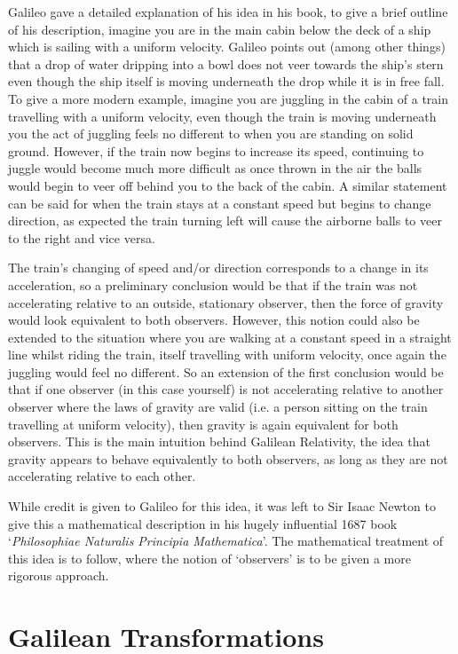 \documentclass[a4paper,12pt,draft]{report}
\begin{document}
Galileo gave a detailed explanation of his idea in his book, to give a brief outline of his description, imagine you are in the main cabin below the deck of a ship which is sailing with a uniform velocity. Galileo points out (among other things) that a drop of water dripping into a bowl does not veer towards the ship's stern even though the ship itself is moving underneath the drop while it is in free fall. To give a more modern example, imagine you are juggling in the cabin of a train travelling with a uniform velocity, even though the train is moving underneath you the act of juggling feels no different to when you are standing on solid ground. However, if the train now begins to increase its speed, continuing to juggle would become much more difficult as once thrown in the air the balls would begin to veer off behind you to the back of the cabin. A similar statement can be said for when the train stays at a constant speed but begins to change direction, as expected the train turning left will cause the airborne balls to veer to the right and vice versa.

The train's changing of speed and/or direction corresponds to a change in its acceleration, so a preliminary conclusion would be that if the train was not accelerating relative to an outside, stationary observer, then the force of gravity would look equivalent to both observers. However, this notion could also be extended to the situation where you are walking at a constant speed in a straight line whilst riding the train, itself travelling with uniform velocity, once again the juggling would feel no different. So an extension of the first conclusion would be that if one observer (in this case yourself) is not accelerating relative to another observer where the laws of gravity are valid (i.e. a person sitting on the train travelling at uniform velocity), then gravity is again equivalent for both observers. This is the main intuition behind Galilean Relativity, the idea that gravity appears to behave equivalently to both observers, as long as they are not accelerating relative to each other.

While credit is given to Galileo for this idea, it was left to Sir Isaac Newton to give this a mathematical description in his hugely influential 1687 book `\emph{Philosophiae Naturalis Principia Mathematica}'. The mathematical treatment of this idea is to follow, where the notion of `observers' is to be given a more rigorous approach.

\section{Galilean Transformations}
\end{document}
